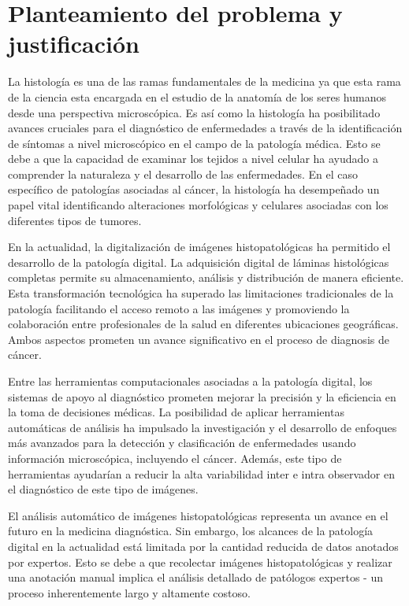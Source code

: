 \documentclass[12pt,letterpaper,final, openany]{scrbook}
\begin{document}
\newpage
\chapter{Planteamiento del problema y justificación}

La histología es una de las ramas fundamentales de la medicina ya que esta rama de la ciencia esta encargada en el estudio de la anatomía de los seres humanos desde una perspectiva microscópica. Es así como la histología ha posibilitado avances cruciales para el diagnóstico de enfermedades a través de la identificación de síntomas a nivel microscópico en el campo de la patología médica. Esto se debe a que la capacidad de examinar los tejidos a nivel celular ha ayudado a comprender la naturaleza y el desarrollo de las enfermedades. En el caso específico de patologías asociadas al cáncer, la histología ha desempeñado un papel vital identificando alteraciones morfológicas y celulares asociadas con los diferentes tipos de tumores.

En la actualidad, la digitalización de imágenes histopatológicas ha permitido el desarrollo de la patología digital. La adquisición digital de láminas histológicas completas permite su almacenamiento, análisis y distribución de manera eficiente. Esta transformación tecnológica ha superado las limitaciones tradicionales de la patología facilitando el acceso remoto a las imágenes y promoviendo la colaboración entre profesionales de la salud en diferentes ubicaciones geográficas. Ambos aspectos prometen un avance significativo en el proceso de diagnosis de cáncer.

Entre las herramientas computacionales asociadas a la patología digital, los sistemas de apoyo al diagnóstico prometen mejorar la precisión y la eficiencia en la toma de decisiones médicas. La posibilidad de aplicar herramientas automáticas de análisis ha impulsado la investigación y el desarrollo de enfoques más avanzados para la detección y clasificación de enfermedades usando información microscópica, incluyendo el cáncer. Además, este tipo de herramientas ayudarían a reducir la alta variabilidad inter e intra observador en el diagnóstico de este tipo de imágenes.

El análisis automático de imágenes histopatológicas representa un avance en el futuro en la medicina diagnóstica. Sin embargo, los alcances de la patología digital en la actualidad está limitada por la cantidad reducida de datos anotados por expertos. Esto se debe a que recolectar imágenes histopatológicas y realizar una anotación manual implica el análisis detallado de patólogos expertos - un proceso inherentemente largo y altamente costoso.
\end{document}
